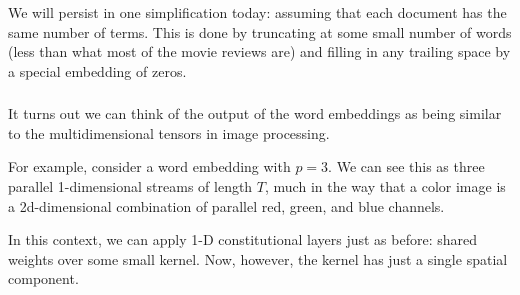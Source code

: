 \documentclass[xetex,mathserif,serif,aspectratio=169]{beamer}
\begin{document}
\begin{frame}[fragile] \frametitle{} \oldB \small


We will persist in one simplification today: assuming that
each document has the same number of terms. This is done by
truncating at some small number of words (less than what
most of the movie reviews are) and filling in any trailing
space by a special embedding of zeros.

\end{frame}

\begin{frame}[fragile] \frametitle{} \oldB \small


\end{frame}


\begin{frame}[fragile] \frametitle{} \oldB \small


It turns out we can think of the output of the word embeddings
as being similar to the multidimensional tensors in image
processing.

For example, consider a word embedding with $p=3$. We can see
this as three parallel 1-dimensional streams of length $T$,
much in the way that a color image is a 2d-dimensional combination
of parallel red, green, and blue channels.

\pause In this context, we can apply 1-D constitutional layers
just as before: shared weights over some small kernel. Now, however,
the kernel has just a single spatial component.

\end{frame}

\begin{frame}[fragile] \frametitle{} \oldB \small


\end{frame}

\begin{frame}[fragile] \frametitle{} \oldB \small


\end{frame}
\end{document}

